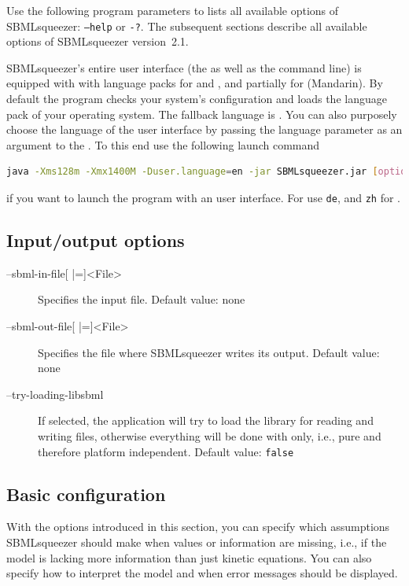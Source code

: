 Use the following program parameters to lists all available options of
SBMLsqueezer: \texttt{--help} or \texttt{-?}.
The subsequent sections describe all available options of SBMLsqueezer
version~2.1.

SBMLsqueezer's entire user interface (the \GUI as well as the command line) is equipped
with with language packs for \German and \English, and partially for \Chinese (Mandarin).
By default the program checks your system's configuration and loads the language pack of
your operating system.
The fallback language is \English.
You can also purposely choose the language of the user interface by passing the language parameter as an
argument to the \JVM.
To this end use the following launch command
\begin{lstlisting}[language=bash, numbers=none, caption={Launching SBMLsqueezer with an alternative language pack}]
java -Xms128m -Xmx1400M -Duser.language=en -jar SBMLsqueezer.jar [options]
\end{lstlisting}
if you want to launch the program with an \English user interface.
For \German use \texttt{de}, and \texttt{zh} for \Chinese.

\subsection{Input/output options}
\label{sec:IO_options}
\begin{description}
\item[--sbml-in-file{[} |={]}<File>]
  Specifies the \SBML input file.
  Default value: none

\item[--sbml-out-file{[} |={]}<File>]
  Specifies the file where SBMLsqueezer writes its \SBML output.
  Default value: none

\item[--try-loading-libsbml]
  If selected, the application will try to load the library \libSBML
  for reading and writing \SBML files, otherwise everything will
  be done with \JSBML only, i.e., pure \Java and therefore platform independent.
  Default value: \texttt{false}
\end{description}

\subsection{Basic configuration}
\label{sec:Basic_configuration}
With the options introduced in this section, you can specify which assumptions
SBMLsqueezer should make when values or information are missing, i.e., if the 
model is lacking more information than just kinetic equations. You can also
specify how to interpret the model and when error messages should be displayed.

